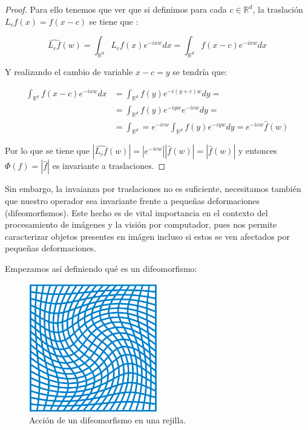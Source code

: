 \begin{proof}
    \noindent Para ello tenemos que ver que si definimos para cada $c \in \mathbb{R}^d$, la traslación $L_cf(x)=f(x-c)$ se tiene que :  
    
    $$\widehat{L_cf}(w)=\int_{\mathbb{R}^d}{L_cf(x) e^{-ixw} dx}=\int_{\mathbb{R}^d}{f(x-c)e^{-ixw}dx}$$
    
    \noindent Y realizando el cambio de variable $x-c=y$ se tendría que: 
    
    \begin{align*}
        \int_{\mathbb{R}^d}{f(x-c)e^{-ixw}dx} &= \int_{\mathbb{R}^d}{f(y)e^{-i(y+c)w}dy}= \\      &=\int_{\mathbb{R}^d}{f(y)e^{-iyw}e^{-icw}dy}= \\ &=\int_{\mathbb{R}^d}=e^{-icw}\int_{\mathbb{R}^d}{f(y)e^{-iyw}dy}=e^{-icw}\widehat{f}(w)
    \end{align*}
    
    \noindent Por lo que se tiene que $|\widehat{L_cf}(w)|=|e^{-icw}| |\widehat{f}(w)|=|\widehat{f}(w)|$ y entonces $\Phi(f)=|\widehat{f}|$ es invariante a traslaciones. \qedhere
\end{proof}

\medskip
    
\noindent Sin embargo, la invaianza por traslaciones no es suficiente, necesitamos también que nuestro operador sea invariante frente a pequeñas deformaciones (difeomorfismos). Este hecho es de vital importancia en el contexto del procesamiento de imágenes y la visión por computador, pues nos permite caracterizar objetos presentes en imágen incluso si estos se ven afectados por pequeñas deformaciones.

\medskip

\noindent Empezamos así definiendo qué es un difeomorfismo: 

\begin{figure}[!h]
    \centering
    \includegraphics[width=0.5\textwidth]{img/Diffeomorphism.png}
    \caption{Acción de un difeomorfismo en una rejilla.}
    \label{fig:difeomorfismo}
\end{figure}

